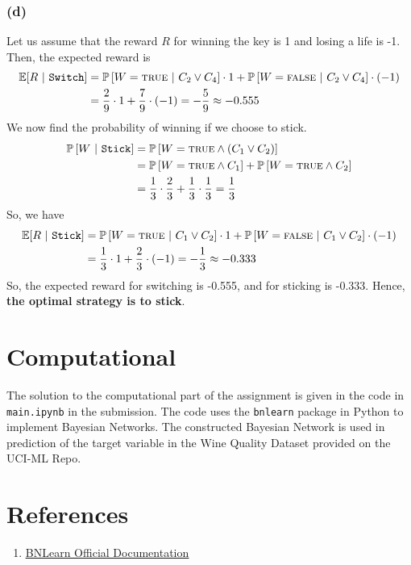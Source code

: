 \documentclass[12pt]{article}
\newcommand{\prob}[1]{\mathbb{P}\left[#1\right]}
\newcommand{\true}{\textsc{true}}
\newcommand{\false}{\textsc{false}}
\begin{document}
    \subsubsection*{(d)}
    Let us assume that the reward $R$ for winning the key is 1 and losing a life is -1. Then, the expected
    reward is
    \begin{align}
        \mathbb{E}[R \ | \ \texttt{Switch}] &= \prob{W = \true \ | \ C_{2} \vee C_{4}} \cdot 1 + \prob{W = \false \ | \ C_{2} \vee C_{4}} \cdot (-1) \\
        &= \frac{2}{9} \cdot 1 + \frac{7}{9} \cdot (-1) = -\frac{5}{9} \approx -0.555
    \end{align}
    We now find the probability of winning if we choose to stick.
    \begin{align}
        \prob{W \ | \ \texttt{Stick}} &= \prob{W = \true \wedge (C_{1} \vee C_{2})} \\
        &= \prob{W = \true \wedge C_{1}} + \prob{W = \true \wedge C_{2}} \\
        &= \frac{1}{3} \cdot \frac{2}{3} + \frac{1}{3} \cdot \frac{1}{3} = \frac{1}{3}
    \end{align}
    So, we have
    \begin{align}
        \mathbb{E}[R \ | \ \texttt{Stick}] &= \prob{W = \true \ | \ C_{1} \vee C_{2}} \cdot 1 + \prob{W = \false \ | \ C_{1} \vee C_{2}} \cdot (-1) \\
        &= \frac{1}{3} \cdot 1 + \frac{2}{3} \cdot (-1) = -\frac{1}{3} \approx -0.333
    \end{align}
    So, the expected reward for switching is -0.555, and for sticking is -0.333. Hence, \textbf{the optimal
    strategy is to stick}.

    \section*{Computational}
    The solution to the computational part of the assignment is given in the code in \texttt{main.ipynb} in the submission.
    The code uses the \texttt{bnlearn} package in Python to implement Bayesian Networks.
    The constructed Bayesian Network is used in prediction of the target variable in
    the Wine Quality Dataset provided on the UCI-ML Repo.

    \section*{References}
    \begin{enumerate}
        \item \href{https://erdogant.github.io/bnlearn/pages/html/index.html}{\color{blue}\underline{BNLearn Official Documentation}}
    \end{enumerate}
\end{document}

